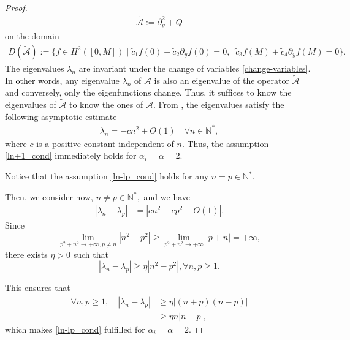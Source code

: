 \documentclass[11pt, dvipsnames]{amsart}
\begin{document}
\begin{proof}
\begin{align*}
          \tilde {\mathcal{A}}:=\partial_y^2+Q
      \end{align*} on the domain
      \begin{align*}
          D(\tilde{\mathcal{A}}):=\{f\in H^2([0,M]) \;|\; \tilde c_1f(0)+\tilde c_2 \partial_y f(0)=0, \;\;  \tilde c_3f(M)+\tilde c_4 \partial_y f(M)=0\}.
      \end{align*} The eigenvalues $\lambda_n$ are invariant under the change of variables \eqref{change-variables}. In \textcolor{black}{other} words,  any eigenvalue $\lambda_n$ of $\mathcal{A}$ is also an eigenvalue of the operator $\tilde{\mathcal{A}}$ and conversely, only 
     the eigenfunctions change. Thus, it suffices to know the eigenvalues of $\tilde{\mathcal{A}}$ to know the ones of $\mathcal{A}.$ From \cite{Fulton1994-eigenvalue}, the eigenvalues satisfy the following asymptotic estimate
     \begin{align}
         \lambda_n= -cn^2+O(1)\quad \forall n\in \mathbb{N}^*,\label{ln-expression}
     \end{align} where $c$ is a positive constant independent of $n.$ Thus, the assumption \eqref{ln+1_cond} immediately holds for $\alpha_i=\alpha=2$. 
     
     Notice that the assumption \eqref{ln-lp_cond} holds for any $n=p\in \mathbb{N}^*.$ 
     
     Then, we consider now, $n\neq p\in \mathbb{N}^*,$ and we have
     \begin{align*}
         |\lambda_n-\lambda_p|&=|cn^2-cp^2+O(1)|.
     \end{align*} 
Since
     \begin{equation}         \lim\limits_{p^{2}+n^{2}\rightarrow+\infty, p\neq n} |n^{2}-p^{2}| \geq \lim\limits_{p^{2}+n^{2}\rightarrow+\infty} |p+n| =   +\infty,
     \end{equation} 
     there exists $\eta>0$ such that
     \begin{equation}
         |\lambda_n-\lambda_p|\geq \eta|n^{2}-p^{2}|, \forall n,p\geq 1.
     \end{equation}
     
     This ensures that
     \begin{align*}
         \forall n,p\geq 1, \quad |\lambda_n-\lambda_p|&\geq \eta|(n+p)(n-p)|\\
         &\geq \eta n|n-p|,
     \end{align*}
      which makes \eqref{ln-lp_cond} fulfilled for $\alpha_i=\alpha=2$. 
\end{proof}
\end{document}
